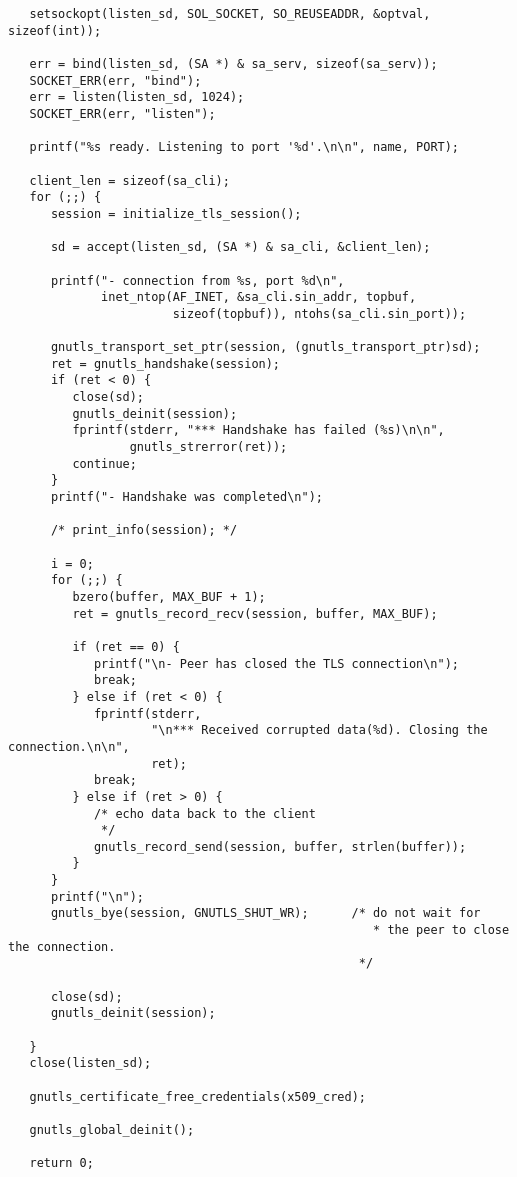 \begin{verbatim}
   setsockopt(listen_sd, SOL_SOCKET, SO_REUSEADDR, &optval, sizeof(int));

   err = bind(listen_sd, (SA *) & sa_serv, sizeof(sa_serv));
   SOCKET_ERR(err, "bind");
   err = listen(listen_sd, 1024);
   SOCKET_ERR(err, "listen");

   printf("%s ready. Listening to port '%d'.\n\n", name, PORT);

   client_len = sizeof(sa_cli);
   for (;;) {
      session = initialize_tls_session();

      sd = accept(listen_sd, (SA *) & sa_cli, &client_len);

      printf("- connection from %s, port %d\n",
             inet_ntop(AF_INET, &sa_cli.sin_addr, topbuf,
                       sizeof(topbuf)), ntohs(sa_cli.sin_port));

      gnutls_transport_set_ptr(session, (gnutls_transport_ptr)sd);
      ret = gnutls_handshake(session);
      if (ret < 0) {
         close(sd);
         gnutls_deinit(session);
         fprintf(stderr, "*** Handshake has failed (%s)\n\n",
                 gnutls_strerror(ret));
         continue;
      }
      printf("- Handshake was completed\n");

      /* print_info(session); */

      i = 0;
      for (;;) {
         bzero(buffer, MAX_BUF + 1);
         ret = gnutls_record_recv(session, buffer, MAX_BUF);

         if (ret == 0) {
            printf("\n- Peer has closed the TLS connection\n");
            break;
         } else if (ret < 0) {
            fprintf(stderr,
                    "\n*** Received corrupted data(%d). Closing the connection.\n\n",
                    ret);
            break;
         } else if (ret > 0) {
            /* echo data back to the client
             */
            gnutls_record_send(session, buffer, strlen(buffer));
         }
      }
      printf("\n");
      gnutls_bye(session, GNUTLS_SHUT_WR);      /* do not wait for
                                                   * the peer to close the connection.
                                                 */

      close(sd);
      gnutls_deinit(session);

   }
   close(listen_sd);

   gnutls_certificate_free_credentials(x509_cred);

   gnutls_global_deinit();

   return 0;


\end{verbatim}
